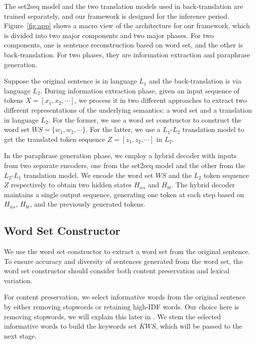 The set2seq model and the two translation models used in back-translation are trained separately, and our framework is designed for the inference period. Figure~\ref{fig:app} shows a macro view of the architecture for our framework, which is divided into two major components and two major phases. For two components, one is sentence reconstruction based on word set, and the other is back-translation. For two phases, they are information extraction and paraphrase generation.


Suppose the original sentence is in language $L_1$ and the back-translation is via language $L_2$. During information extraction phase, given an input sequence of tokens $X = [x_1, x_2, \cdots]$, we process it in two different approaches to extract two different representations of the underlying semantics: a word set and a translation in language $L_2$. For the former, we use a word set constructor to construct the word set $WS = \{w_1, w_2,\cdots\}$. For the latter, we use a $L_1$-$L_2$ translation model to get the translated token sequence $Z = [z_1, z_2, \cdots]$ in $L_2$. 


In the paraphrase generation phase, we employ a hybrid decoder with inputs from two separate encoders, one from the set2seq model and the other from the $L_2$-$L_1$ translation model. We encode the word set $WS$ and the $L_2$ token sequence $Z$ respectively to obtain two hidden states $H_{ws}$ and $H_{bt}$. The hybrid decoder maintains a single output sequence, generating one token at each step based on $H_{ws}$, $H_{bt}$, and the previously generated tokens.


\subsection{Word Set Constructor} \label{sec:wordset}
We use the word set constructor to extract a word set from the original sentence. To ensure accuracy and diversity of sentences generated from the word set, the word set constructor should consider both content preservation and lexical variation.

For content preservation, we select informative words from the original 
sentence by either removing stopwords or retaining high-IDF words. Our choice here is removing stopwords, we will explain this later in . We stem the selected informative words to build the 
keywords set $KWS$, which will be passed to the next stage. 

